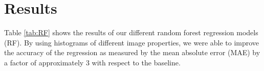 \documentclass[10pt,conference,compsocconf]{IEEEtran}
\begin{document}








\section{Results}
\label{sec:results}

Table \ref{tab:RF} shows the results of our different random forest regression models (RF). By using histograms of different image properties, we were able to improve the accuracy of the regression as measured by the mean absolute error (MAE) by a factor of approximately 3 with respect to the baseline.
\end{document}
